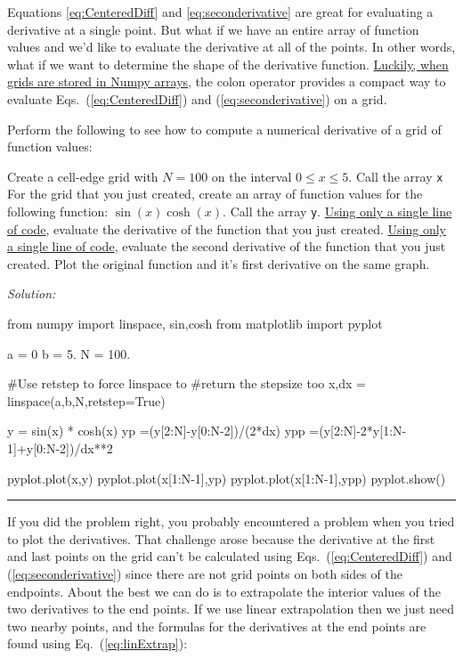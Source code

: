 Equations \eqref{eq:CenteredDiff} and \eqref{eq:seconderivative} are
great for evaluating a derivative at a single point.  But what if we
have an entire array of function values and we'd like to evaluate the
derivative at all of the points.  In other words, what if we want to
determine the shape of the derivative function.
\ul{Luckily, when grids are stored in Numpy arrays}, the colon operator
provides a compact way to evaluate Eqs.~(\ref{eq:CenteredDiff}) and
(\ref{eq:seconderivative}) on a grid.  

\begin{enumerate}
\probtwo Perform the following to see how to compute a numerical
derivative of a grid of function values:\label{derivOnGrid}
\begin{enumerate}
\subprob Create a cell-edge grid with $N=100$ on the interval $0 \le x
    \le 5$.  Call the array \texttt{x}
\subprob For the grid that you just created, create an array of
function values for the following function: $\sin(x) \cosh(x)$.  Call
the array \texttt{y}.
\subprob \ul{Using only a single line of code}, evaluate the derivative of
the function that you just created. 
\subprob \ul{Using only a single line of code}, evaluate the second derivative of
the function that you just created. 
\subprob  Plot the original function and it's first derivative on the
same graph.
\end{enumerate}
\end{enumerate}
\ifsolutions
\textit{Solution:}\\
\begin{codeexample}
\begin{VerbatimOut}{\listingFile}
from numpy import linspace, sin,cosh
from matplotlib import pyplot

a = 0
b = 5.
N = 100.

#Use retstep to force linspace to
#return the stepsize too
x,dx = linspace(a,b,N,retstep=True)  


y = sin(x) * cosh(x)
yp =(y[2:N]-y[0:N-2])/(2*dx)
ypp =(y[2:N]-2*y[1:N-1]+y[0:N-2])/dx**2

pyplot.plot(x,y)
pyplot.plot(x[1:N-1],yp)
pyplot.plot(x[1:N-1],ypp)
pyplot.show()
\end{VerbatimOut}
\end{codeexample}
\else
\noindent\rule{5 in}{0.01 in}
\fi

If you did the problem right, you probably encountered a problem when
you tried to plot the derivatives.  That challenge arose because the
derivative at the first and last points on the grid can't be
calculated using Eqs.~(\ref{eq:CenteredDiff}) and
(\ref{eq:seconderivative}) since there are not grid points on both
sides of the endpoints. About the best we can do is to extrapolate the
interior values of the two derivatives to the end
points. If we use linear extrapolation
 then we just need two nearby points, and
the formulas for the derivatives at the end points are found using
Eq.~(\ref{eq:linExtrap}):

